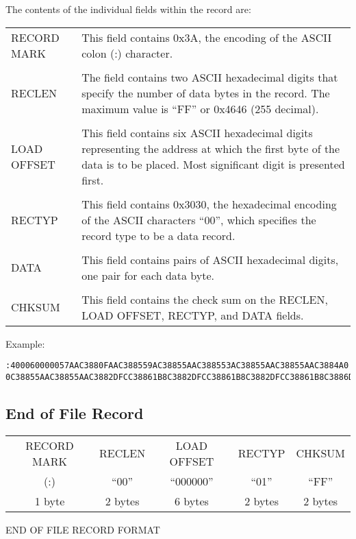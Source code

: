 The contents of the individual fields within the record are:

\begin{tabular}{l p{10cm}}
RECORD MARK & This field contains 0x3A, the encoding of the ASCII colon (:) character. \\
& \\
RECLEN & The field contains two ASCII hexadecimal digits that specify the number of data bytes in the record. The maximum value is ``FF'' or 0x4646 (255 decimal). \\
& \\
LOAD OFFSET & This field contains six ASCII hexadecimal digits representing the address at which the first byte of the data is to be placed. Most significant digit is presented first.\\
& \\
RECTYP & This field contains 0x3030, the hexadecimal encoding of the ASCII characters ``00'', which specifies the record type to be a data record. \\
& \\
DATA & This field contains pairs of ASCII hexadecimal digits, one pair for each data byte. \\
& \\
CHKSUM & This field contains the check sum on the RECLEN, LOAD OFFSET, RECTYP, and DATA fields. \\
\end{tabular}

Example:

\begin{verbatim}
:400060000057AAC3880FAAC388559AC38855AAC388553AC38855AAC38855AAC3884A0
0C38855AAC38855AAC3882DFCC38861B8C3882DFCC38861B8C3882DFCC38861B8C3886D
\end{verbatim}

\subsection{End of File Record}

\begin{center}
\begin{tabular}{| c | c | c | c | c |}
\hline
RECORD MARK & RECLEN & LOAD OFFSET & RECTYP & CHKSUM \\
(:) & ``00'' & ``000000'' & ``01'' & ``FF''  \\
\hline
1 byte & 2 bytes & 6 bytes & 2 bytes & 2 bytes \\
\hline
\end{tabular}

END OF FILE RECORD FORMAT
\end{center}

